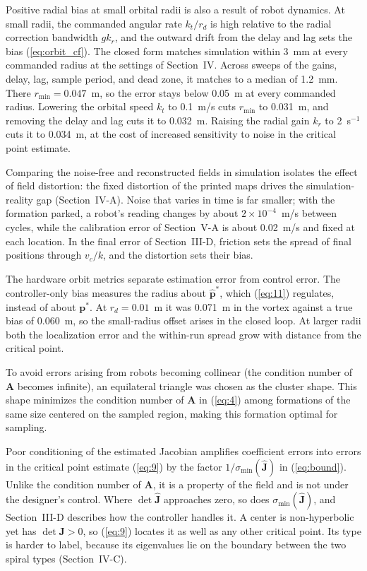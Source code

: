 \documentclass[lettersize,journal]{IEEEtran}
\newcommand{\rev}[1]{#1}
\begin{document}
Positive radial bias at small orbital radii is also a result of robot dynamics. At small radii, the commanded angular rate $k_t / r_d$ is high relative to the radial correction bandwidth $gk_r$, and the outward drift from the delay and lag sets the bias (\ref{eq:orbit_cf}). The closed form matches simulation within \rev{3}~mm at every commanded radius at the settings of Section~IV. Across sweeps of the gains, delay, lag, sample period, and dead zone, it matches to a median of \rev{1.2}~mm. There $r_{\min} = \rev{0.047}$~m, so the error stays below 0.05~m at every commanded radius. Lowering the orbital speed $k_t$ to 0.1~m/s cuts $r_{\min}$ to \rev{0.031}~m, and removing the delay and lag cuts it to \rev{0.032}~m. Raising the radial gain $k_r$ to 2~s$^{-1}$ cuts it to \rev{0.034}~m, at the cost of increased sensitivity to noise in the critical point estimate.

Comparing the noise-free and reconstructed fields in simulation isolates the effect of field distortion: the fixed distortion of the printed maps drives the simulation-reality gap (Section~IV-A). Noise that varies in time is far smaller; with the formation parked, a robot's reading changes by about \rev{$2\times10^{-4}$}~m/s between cycles, while the calibration error of Section~V-A is about 0.02~m/s and fixed at each location. In the final error of Section~III-D, friction sets the spread of final positions through $v_c/k$, and the distortion sets their bias.

The hardware orbit metrics separate estimation error from control error. The controller-only bias measures the radius about $\hat{\mathbf{p}}^*$, which (\ref{eq:11}) regulates, instead of about $\mathbf{p}^*$. At $r_d = 0.01$~m it was \rev{0.071}~m in the vortex against a true bias of \rev{0.060}~m, so the small-radius offset arises in the closed loop. At larger radii both the localization error and the within-run spread grow with distance from the critical point.

To avoid errors arising from robots becoming collinear (the condition number of $\mathbf{A}$ becomes infinite), an equilateral triangle was chosen as the cluster shape. This shape minimizes the condition number of $\mathbf{A}$ in (\ref{eq:4}) among formations of the same size centered on the sampled region, making this formation optimal for sampling.

Poor conditioning of the estimated Jacobian amplifies coefficient errors into errors in the critical point estimate (\ref{eq:9}) by the factor $1/\sigma_{\min}(\hat{\mathbf{J}})$ in (\ref{eq:bound}). Unlike the condition number of $\mathbf{A}$, it is a property of the field and is not under the designer's control. Where $\det\hat{\mathbf{J}}$ approaches zero, so does $\sigma_{\min}(\hat{\mathbf{J}})$, and Section~III-D describes how the controller handles it. A center is non-hyperbolic yet has $\det\mathbf{J} > 0$, so (\ref{eq:9}) locates it as well as any other critical point. Its type is harder to label, because its eigenvalues lie on the boundary between the two spiral types (Section~IV-C).
\end{document}

